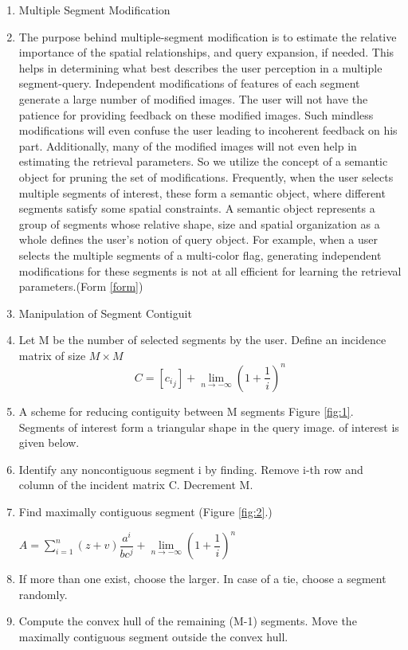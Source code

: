 \documentclass{acmart}
\begin{document}
\begin{enumerate}
    \item  	Multiple Segment Modification 
    \item   The purpose behind multiple-segment modification is to estimate the relative importance of the spatial relationships, and query expansion, if needed. This helps in determining what best describes the user perception in a multiple segment-query. Independent modifications of features of each segment generate a large number of modified images. The user will not have the patience for providing feedback on these modified images. Such mindless modifications will even confuse the user leading to incoherent feedback on his part. Additionally, many of the modified images will not even help in estimating the retrieval parameters. So we utilize the concept of a semantic object for pruning the set of modifications. Frequently, when the user selects multiple segments of interest, these form a semantic object, where different segments satisfy some spatial constraints. A semantic object represents a group of segments whose relative shape, size and spatial organization as a whole defines the user's notion of query object. For example, when a user selects the multiple segments of a multi-color flag, generating independent modifications for these segments is not at all efficient for learning the retrieval parameters.(Form \ref{form})
    \item Manipulation of Segment Contiguit
    \item Let M be the number of selected segments by the user. Define an incidence matrix of size $ M \times M$
    \begin{equation}
        C=[{c_i}_j]+\lim_{n \to -\infty}\left(1+\frac{1}{i}\right)^n\label{form}
    \end{equation}
    \item A scheme for reducing contiguity between M segments Figure \ref{fig:1}. Segments of interest form a triangular shape in the query image. of interest is given below.
    
    \item Identify any noncontiguous segment i by finding. Remove i-th row and column of the incident matrix C. Decrement M.
    
    \item Find maximally contiguous segment (Figure \ref{fig:2}.)
    \begin{center}
    $A = \sum\limits_{i=1}^n(z+v)\dfrac{a^i }{bc^j} + \lim\limits_{n \to -\infty}\left(1+\dfrac{1}{i}\right)^n$
    \end{center} 
    \item If more than one exist, choose the larger. In case of a tie, choose a segment randomly.
    \item Compute the convex hull of the remaining (M-1) segments. Move the maximally contiguous segment outside the convex hull.
    

\end{enumerate}
\end{document}
